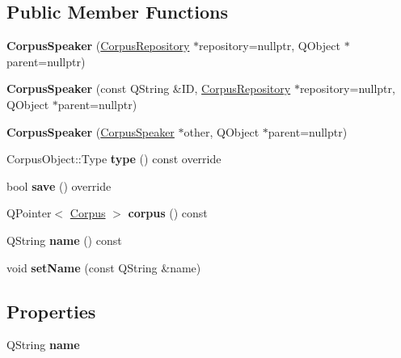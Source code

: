 \subsection*{Public Member Functions}
\begin{DoxyCompactItemize}
\item 
\mbox{\label{class_corpus_speaker_ac6785e47e5c18dcb6a2e224bf2041e03}} 
{\bfseries Corpus\+Speaker} (\hyperlink{class_corpus_repository}{Corpus\+Repository} $\ast$repository=nullptr, Q\+Object $\ast$parent=nullptr)
\item 
\mbox{\label{class_corpus_speaker_adaf34144e48ae95cc0e851230bd030e2}} 
{\bfseries Corpus\+Speaker} (const Q\+String \&ID, \hyperlink{class_corpus_repository}{Corpus\+Repository} $\ast$repository=nullptr, Q\+Object $\ast$parent=nullptr)
\item 
\mbox{\label{class_corpus_speaker_a8bc148ef6e1dd73b4d753ab6a7f46e03}} 
{\bfseries Corpus\+Speaker} (\hyperlink{class_corpus_speaker}{Corpus\+Speaker} $\ast$other, Q\+Object $\ast$parent=nullptr)
\item 
\mbox{\label{class_corpus_speaker_ad047ccc247cb334b423ca53bd2f6fdfa}} 
Corpus\+Object\+::\+Type {\bfseries type} () const override
\item 
\mbox{\label{class_corpus_speaker_ae8c6db0e0a36c7451b33e9d03bbb2314}} 
bool {\bfseries save} () override
\item 
\mbox{\label{class_corpus_speaker_a985fae57684965b1e57543828e7d2bef}} 
Q\+Pointer$<$ \hyperlink{class_corpus}{Corpus} $>$ {\bfseries corpus} () const
\item 
\mbox{\label{class_corpus_speaker_ab45ecf49db31a373de485010721e34f6}} 
Q\+String {\bfseries name} () const
\item 
\mbox{\label{class_corpus_speaker_aba787a3910c61d8a7ecee3547b0f98c6}} 
void {\bfseries set\+Name} (const Q\+String \&name)
\end{DoxyCompactItemize}
\subsection*{Properties}
\begin{DoxyCompactItemize}
\item 
\mbox{\label{class_corpus_speaker_a26ce91c653237ba60b54c2618727f54f}} 
Q\+String {\bfseries name}
\end{DoxyCompactItemize}
